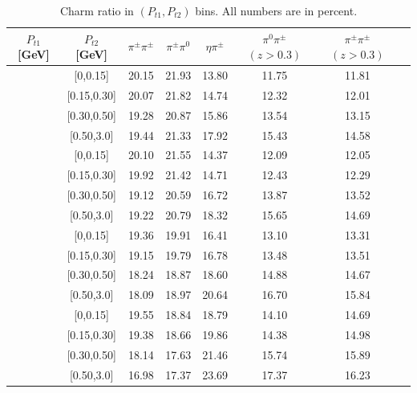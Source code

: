 \documentclass[aps,prX,preprint,groupedaddress,linenumbers]{revtex4-1}
\begin{document}
\begin{table}[H]
\centering
\begin{tabular}{|c|c||c|c|c|c|c|c|}
\hline
$P_{t1}$ [GeV] & $P_{t2}$ [GeV] &$\pi^{\pm}\pi^{\pm}$ & $\pi^{\pm}\pi^0$ & $\eta\pi^{\pm}$ & $\pi^0\pi^{\pm}$ $(z>0.3)$ & $\pi^{\pm}\pi^{\pm}$ $(z>0.3)$ \\ \hline\hline
[0,0.15]	&	[0,0.15]	&	20.15	&	21.93	&	13.80	&	11.75	&	11.81	\\ \hline
[0,0.15]	&	[0.15,0.30]	&	20.07	&	21.82	&	14.74	&	12.32	&	12.01	\\ \hline
[0,0.15]	&	[0.30,0.50]	&	19.28	&	20.87	&	15.86	&	13.54	&	13.15	\\ \hline
[0,0.15]	&	[0.50,3.0]	&	19.44	&	21.33	&	17.92	&	15.43	&	14.58	\\ \hline\hline
[0.15,0.30]	&	[0,0.15]	&	20.10	&	21.55	&	14.37	&	12.09	&	12.05	\\ \hline
[0.15,0.30]	&	[0.15,0.30]	&	19.92	&	21.42	&	14.71	&	12.43	&	12.29	\\ \hline
[0.15,0.30]	&	[0.30,0.50]	&	19.12	&	20.59	&	16.72	&	13.87	&	13.52	\\ \hline
[0.15,0.30]	&	[0.50,3.0]	&	19.22	&	20.79	&	18.32	&	15.65	&	14.69	\\ \hline\hline
[0.30,0.50]	&	[0,0.15]	&	19.36	&	19.91	&	16.41	&	13.10	&	13.31	\\ \hline
[0.30,0.50]	&	[0.15,0.30]	&	19.15	&	19.79	&	16.78	&	13.48	&	13.51	\\ \hline
[0.30,0.50]	&	[0.30,0.50]	&	18.24	&	18.87	&	18.60	&	14.88	&	14.67	\\ \hline
[0.30,0.50]	&	[0.50,3.0]	&	18.09	&	18.97	&	20.64	&	16.70	&	15.84	\\ \hline\hline
[0.50,3.0]	&	[0,0.15]	&	19.55	&	18.84	&	18.79	&	14.10	&	14.69	\\ \hline
[0.50,3.0]	&	[0.15,0.30]	&	19.38	&	18.66	&	19.86	&	14.38	&	14.98	\\ \hline
[0.50,3.0]	&	[0.30,0.50]	&	18.14	&	17.63	&	21.46	&	15.74	&	15.89	\\ \hline
[0.50,3.0]	&	[0.50,3.0]	&	16.98	&	17.37	&	23.69	&	17.37	&	16.23	\\ \hline
\end{tabular}
\caption[Charm ratio in combined $(P_{t1},P_{t2})$ bins]{Charm ratio in $(P_{t1},P_{t2})$ bins. All numbers are in percent.}
\label{tab:comptcharmratio}
\end{table}
\end{document}
